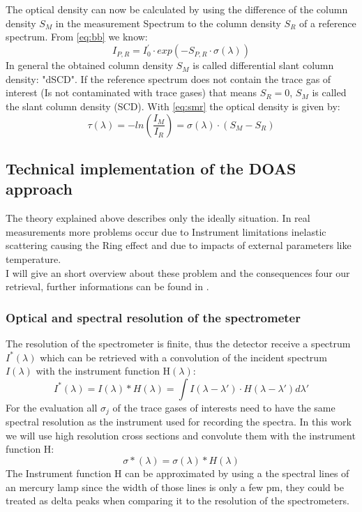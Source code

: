 \documentclass  [
  paper    = a4,
  BCOR     = 10mm,
  twoside,
  fontsize = 12pt,
  fleqn,
  toc      = bibnumbered,
  toc      = listofnumbered,
  numbers  = noendperiod,
  headings = normal,
  listof   = leveldown,
  version  = 3.03
]                                       {scrreprt}
\begin{document}
	The optical density can now be calculated by using the difference of the column density $S_{M}$ in the measurement Spectrum to the column density $S_{R}$ of a reference spectrum. From \cref{eq:bb} we know:	
	\begin{equation}
	I_{P,R} = I^{'}_{0}\cdot exp\left(-S_{P,R}\cdot\sigma\left(\lambda\right)\right)
	\label{eq:smr}
	\end{equation}
	In general the obtained column density $S_{M}$ is called differential slant column density: "dSCD". If the reference spectrum does not contain the trace gas of interest (Is not contaminated with trace gases) that means $S_{R} = 0$, $S_{M}$ is called the slant column	density (SCD). 
	With \cref{eq:smr} the optical density is given by:
	\begin{equation}
	\tau\left(\lambda\right) = -ln\left(\frac{I_{M}}{I_{R}}\right) = \sigma\left(\lambda\right)\cdot\left(S_{M}-S_{R}\right)
	\end{equation}

	
	
	\subsection{Technical implementation of the DOAS approach}
	The theory explained above describes only the ideally situation. In real measurements more problems occur due to Instrument limitations inelastic scattering causing the Ring effect and due to impacts of external parameters like temperature.\\
	I will give an short overview about these problem and the consequences four our retrieval, further informations can be found in \cite{lubcke2014optical}.\\
	\subsubsection*{Optical and spectral resolution of the spectrometer}
	The resolution of the spectrometer is finite, thus the detector receive a spectrum $I^{*}\left(\lambda\right)$ which can be retrieved with a convolution of the incident spectrum $I\left(\lambda\right)$ with the instrument function H$\left(\lambda\right)$:
	\begin{equation}
	I^{*}\left(\lambda\right) = I\left(\lambda\right)*H\left(\lambda\right)=\int I\left(\lambda-\lambda{'}\right)\cdot H\left(\lambda-\lambda{'}\right)d\lambda{'}
	\end{equation} 
	For the evaluation all $\sigma_{j}$  of the trace gases of interests need to have the same spectral resolution as the instrument used for recording the spectra. In this work we will use high resolution cross sections and convolute them with the instrument function H:
	\begin{equation}
	\sigma{*}\left(\lambda\right) = \sigma\left(\lambda\right)*H\left(\lambda\right)
	\end{equation}
	The Instrument function H can be approximated by using a the spectral lines of an mercury lamp since the width of those lines is only a few pm, they could be treated as delta peaks when comparing it to the resolution of the spectrometers.
	
\end{document}
